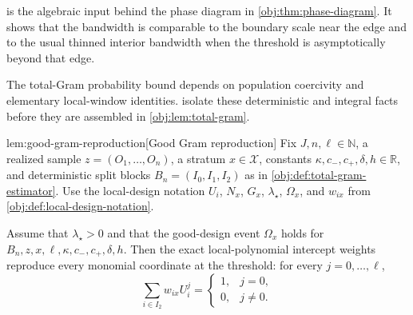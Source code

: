 \documentclass[11pt]{article}
\begin{document}
 is the algebraic input behind the phase diagram in \cref{obj:thm:phase-diagram}. It shows that the bandwidth is comparable to the boundary scale near the edge and to the usual thinned interior bandwidth when the threshold is asymptotically beyond that edge.

The total-Gram probability bound depends on population coercivity and elementary local-window identities.  isolate these deterministic and integral facts before they are assembled in \cref{obj:lem:total-gram}.

\begin{lemmav}{lem:good-gram-reproduction}[Good Gram reproduction]
Fix \(J,n,\ell\in\mathbb N\), a realized sample \(z=(O_1,\ldots,O_n)\), a stratum \(x\in\mathcal X\), constants \(\kappa,c_-,c_+,\delta,h\in\mathbb R\), and deterministic split blocks \(B_n=(I_0,I_1,I_2)\) as in \cref{obj:def:total-gram-estimator}.  Use the local-design notation \(U_i\), \(N_x\), \(G_x\), \(\lambda_\star\), \(\Omega_x\), and \(w_{ix}\) from \cref{obj:def:local-design-notation}.

Assume that \(\lambda_\star>0\) and that the good-design event \(\Omega_x\) holds for \(B_n,z,x,\ell,\kappa,c_-,c_+,\delta,h\).  Then the exact local-polynomial intercept weights reproduce every monomial coordinate at the threshold: for every \(j=0,\ldots,\ell\),
\[
\sum_{i\in I_2} w_{ix} U_i^j
=
\begin{cases}
1, & j=0,\\
0, & j\ne 0.
\end{cases}
\]
\end{lemmav}
\end{document}
